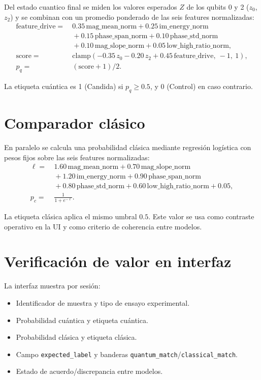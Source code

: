 \documentclass[11pt,a4paper,spanish]{book}
\begin{document}
Del estado cuantico final se miden los valores esperados $Z$ de los qubits 0 y 2 ($z_0$, $z_2$) y se combinan con un promedio ponderado de las seis features normalizadas:
\begin{align*}
\mathrm{feature\_drive} = &\ 0.35\,\mathrm{mag\_mean\_norm} + 0.25\,\mathrm{im\_energy\_norm} \\
&\ + 0.15\,\mathrm{phase\_span\_norm} + 0.10\,\mathrm{phase\_std\_norm} \\
&\ + 0.10\,\mathrm{mag\_slope\_norm} + 0.05\,\mathrm{low\_high\_ratio\_norm}, \\
\mathrm{score} = &\ \mathrm{clamp}(-0.35\,z_0 - 0.20\,z_2 + 0.45\,\mathrm{feature\_drive},\ -1,\ 1), \\
p_q = &\ (\mathrm{score} + 1)/2.
\end{align*}

La etiqueta cu\'{a}ntica es 1 (Candida) si $p_q \geq 0.5$, y 0 (Control) en caso contrario.

\section{Comparador cl\'{a}sico}

En paralelo se calcula una probabilidad cl\'{a}sica mediante regresi\'{o}n log\'{i}stica con pesos fijos sobre las seis features normalizadas:
\begin{align*}
\ell = &\ 1.60\,\mathrm{mag\_mean\_norm} + 0.70\,\mathrm{mag\_slope\_norm} \\
&\ + 1.20\,\mathrm{im\_energy\_norm} + 0.90\,\mathrm{phase\_span\_norm} \\
&\ + 0.80\,\mathrm{phase\_std\_norm} + 0.60\,\mathrm{low\_high\_ratio\_norm} + 0.05, \\
p_c = &\ \frac{1}{1 + e^{-\ell}}.
\end{align*}

La etiqueta cl\'{a}sica aplica el mismo umbral $0.5$. Este valor se usa como contraste operativo en la UI y como criterio de coherencia entre modelos.

\section{Verificaci\'{o}n de valor en interfaz}

La interfaz muestra por sesi\'{o}n:
\begin{itemize}
	\item Identificador de muestra y tipo de ensayo experimental.
	\item Probabilidad cu\'{a}ntica y etiqueta cu\'{a}ntica.
	\item Probabilidad cl\'{a}sica y etiqueta cl\'{a}sica.
	\item Campo \texttt{expected\_label} y banderas \texttt{quantum\_match}/\texttt{classical\_match}.
	\item Estado de acuerdo/discrepancia entre modelos.
\end{itemize}
\end{document}
